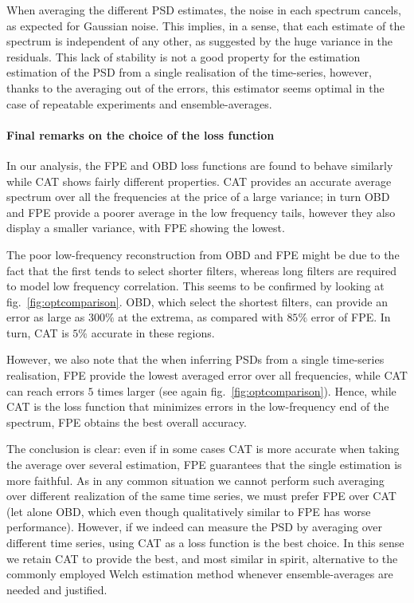 \documentclass[twocolumn,showpacs,preprintnumbers,nofootinbib,prd,
superscriptaddress,10pt]{revtex4-1}
\begin{document}
When averaging the different PSD estimates, the noise in each spectrum cancels, as expected for Gaussian noise. 
This implies, in a sense, that each estimate of the spectrum is independent of any other, as suggested by the huge variance in the residuals. This lack of stability is not a good property for the estimation estimation of the PSD from a single realisation of the time-series, however, thanks to the averaging out of the errors, this estimator seems optimal in the case of repeatable experiments and ensemble-averages.

\paragraph{Final remarks on the choice of the loss function}

In our analysis, the FPE and OBD loss functions are found to behave similarly while CAT shows fairly different properties.
CAT provides an accurate average spectrum over all the frequencies at the price of a large variance; in turn OBD and FPE 
provide a poorer average in the low frequency tails, however they also display a  smaller variance, with FPE showing the lowest.

The poor low-frequency reconstruction from OBD and FPE might be due to the fact that the first tends to select shorter filters, whereas long filters are required to model low frequency correlation.
This seems to be confirmed by looking at fig.~\ref{fig:optcomparison}. OBD, which select the shortest filters, can provide an error as large as $300 \%$ at the extrema, as compared with $85\%$ error of FPE. In turn, CAT is $5\%$ accurate in these regions.

However, we also note that the when inferring PSDs from a single time-series realisation, FPE provide the lowest averaged error over all frequencies, while CAT can reach errors $5$ times larger (see again fig.~\ref{fig:optcomparison}).
Hence, while CAT is the loss function that minimizes errors in the low-frequency end of the spectrum, FPE obtains the best overall accuracy. 

The conclusion is clear: even if in some cases CAT is more accurate when taking the average over several estimation, FPE guarantees that the single estimation is more faithful.
As in any common situation we cannot perform such averaging over different realization of the same time series, we must prefer FPE over CAT (let alone OBD, which even though qualitatively similar to FPE has worse performance).
However, if we indeed can measure the PSD by averaging over different time series, using CAT as a loss function is the best choice. In this sense we retain CAT to provide the best, and most similar in spirit, alternative to the commonly employed Welch estimation method whenever ensemble-averages are needed and justified.
\end{document}
